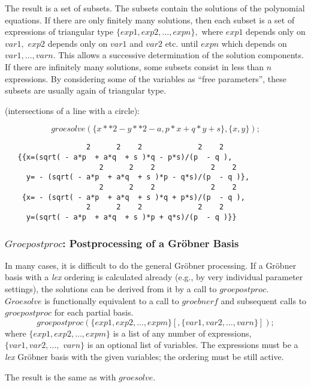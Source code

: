 The result is a set of subsets. The subsets contain the solutions of the
polynomial equations. If there are only finitely many solutions,
then each subset is a set of expressions of triangular type
$\{exp1, exp2,\ldots , expn\},$ where $exp1$ depends only on
$var1,$ $exp2$ depends only on $var1$ and $var2$ etc. until $expn$ which
depends on $var1,\ldots,varn.$ This allows a successive determination of
the solution components. If there are infinitely many solutions,
some subsets consist in less than $n$ expressions. By considering some
of the variables as ``free parameters'',  these subsets are usually
again of triangular type.

\example (intersections of a line with a circle):

\[ groesolve(\{x**2 - y**2 - a, p*x+q*y+s\},\{x,y\}); \]

\begin{verbatim}
                   2      2    2             2    2
   {{x=(sqrt( - a*p  + a*q  + s )*q - p*s)/(p  - q ),
                      2      2    2             2    2
     y= - (sqrt( - a*p  + a*q  + s )*p - q*s)/(p  - q )},
                      2      2    2             2    2
    {x= - (sqrt( - a*p  + a*q  + s )*q + p*s)/(p  - q ),
                   2      2    2             2    2
     y=(sqrt( - a*p  + a*q  + s )*p + q*s)/(p  - q )}}
\end{verbatim}

\subsubsection{$Groepostproc$: Postprocessing of a Gr\"obner Basis}
In many cases, it is difficult to do the general Gr\"obner processing.
If a Gr\"obner basis with a {\it lex} ordering is calculated already (e.g.,
by very individual parameter settings), the solutions can be derived
from it by a call to $groepostproc$. $Groesolve$ is functionally
equivalent to a call to $groebnerf$ and subsequent calls to
$groepostproc$ for each partial basis.
\[
 groepostproc(\{exp1, exp2, \ldots , expm\}[,\{var1, var2, \ldots ,
varn\}]);
\]
where $\{exp1, exp2, \ldots , expm\}$ is a list of any number of
expressions, \linebreak[4] $\{var1, var2, \ldots ,$ $ varn\}$ is an
optional list of variables. The expressions must be a {\it lex} Gr\"obner
basis with the given variables; the ordering must be still active.

The result is the same as with $groesolve$.


